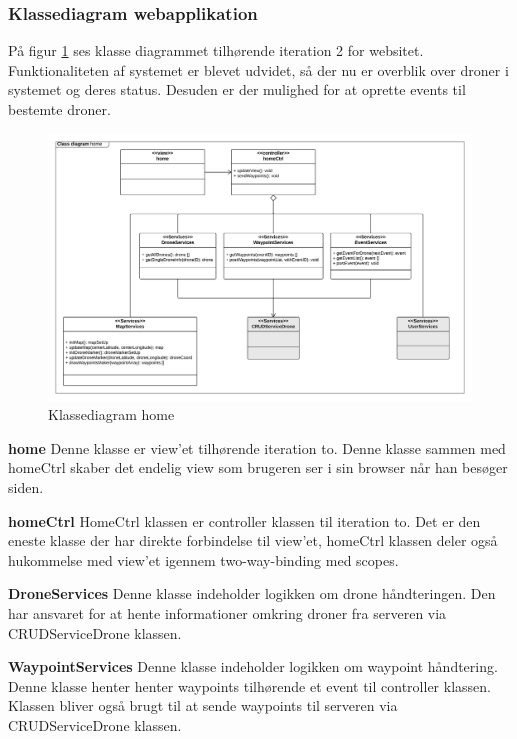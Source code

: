 \subsubsection*{Klassediagram webapplikation}
\vspace{-0.1cm}
På figur \ref{fig:classDiagram_home} ses klasse diagrammet tilhørende iteration 2 for websitet. Funktionaliteten af systemet er blevet udvidet, så der nu er overblik over droner i systemet og deres status. Desuden er der mulighed for at oprette events til bestemte droner. 
\begin{figure}[H]
	\centering
	\includegraphics[width=1.\textwidth]{Billeder/klasse_diagrammer/home_class_diagram.png}
	\vspace{-0.5cm}
	\caption{Klassediagram home}
	\label{fig:classDiagram_home}
\end{figure}

\textbf{home}
Denne klasse er view'et tilhørende iteration to. Denne klasse sammen med homeCtrl skaber det endelig view som brugeren ser i sin browser når han besøger siden.

\textbf{homeCtrl}
HomeCtrl klassen er controller klassen til iteration to. Det er den eneste klasse der har direkte forbindelse til view'et, homeCtrl klassen deler også hukommelse med view'et igennem two-way-binding med scopes.

\textbf{DroneServices}
Denne klasse indeholder logikken om drone håndteringen. Den har ansvaret for at hente informationer omkring droner fra serveren via CRUDServiceDrone klassen.

\textbf{WaypointServices}
Denne klasse indeholder logikken om waypoint håndtering. Denne klasse henter henter waypoints tilhørende et event til controller klassen. Klassen bliver også brugt til at sende waypoints til serveren via CRUDServiceDrone klassen.

